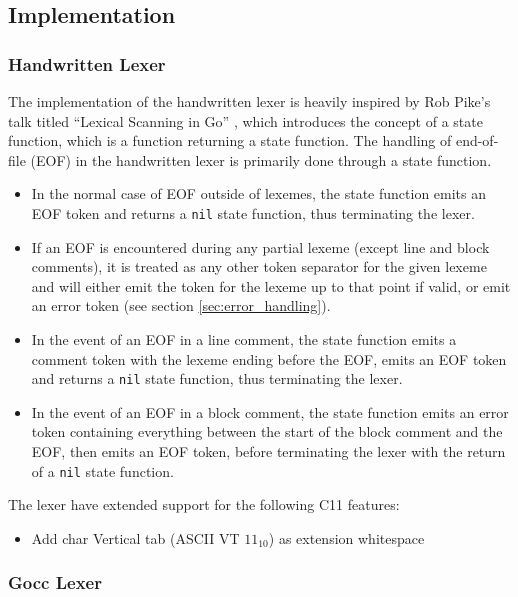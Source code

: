 \subsection{Implementation}

\subsubsection{Handwritten Lexer}

The implementation of the handwritten lexer is heavily inspired by Rob Pike's talk titled ``Lexical Scanning in Go'' \cite{lexical_scanning_in_go}, which introduces the concept of a state function, which is a function returning a state function. The handling of end-of-file (EOF) in the handwritten lexer is primarily done through a state function.

\begin{itemize}
	\item In the normal case of EOF outside of lexemes, the state function emits an EOF token and returns a \texttt{nil} state function, thus terminating the lexer.
	\item If an EOF is encountered during any partial lexeme (except line and block comments), it is treated as any other token separator for the given lexeme and will either emit the token for the lexeme up to that point if valid, or emit an error token (see section \ref{sec:error_handling}).
	\item In the event of an EOF in a line comment, the state function emits a comment token with the lexeme ending before the EOF, emits an EOF token and returns a \texttt{nil} state function, thus terminating the lexer.
	\item In the event of an EOF in a block comment, the state function emits an error token containing everything between the start of the block comment and the EOF, then emits an EOF token, before terminating the lexer with the return of a \texttt{nil} state function.
\end{itemize}

The lexer have extended support for the following C11 features:

\begin{itemize}
	\item Add char Vertical tab (ASCII VT $11_{10}$) as extension whitespace
\end{itemize}

\subsubsection{Gocc Lexer}


